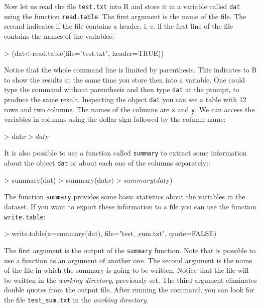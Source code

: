 \documentclass[letterpaper,12pt,oneside]{article}
\begin{document}
Now let us read the file {\tt test.txt} into R and store it in a variable called {\tt dat} using the function {\tt read.table}. The first argument is the name of the file. The second indicates if the file contains a header, i. e.  if the first line of the file contains the names of the variables:

\begin{Schunk}
\begin{Sinput}
> (dat<-read.table(file="test.txt", header=TRUE))
\end{Sinput}
\end{Schunk}


Notice that the whole command line is limited by parenthesis. This indicates to R to show the results at the same time you store then into a variable. One could type the command without parenthesis and then type {\tt dat} at the prompt, to produce the same result. Inspecting the object {\tt dat} you can see a table with 12 rows and two columns. The names of the columns are {\tt x} and {\tt y}. We can access the variables in columns using the dollar sign followed by the column name:

\begin{Schunk}
\begin{Sinput}
> dat$x
> dat$y 
\end{Sinput}
\end{Schunk}

It is also possible to use a function called {\tt summary} to extract some information about the object {\tt dat} or about each one of the columns separately:: 

\begin{Schunk}
\begin{Sinput}
> summary(dat)
> summary(dat$x)
> summary(dat$y)
\end{Sinput}
\end{Schunk}

The function {\tt summary} provides some basic statistics about the variables in the dataset. If you want to export these information to a file you can use the function {\tt write.table}:

\begin{Schunk}
\begin{Sinput}
> write.table(x=summary(dat), file="test_sum.txt", quote=FALSE)
\end{Sinput}
\end{Schunk}

The first argument is the output of the {\tt summary} function. Note that is possible to use a function as an argument of another one. The second argument is the name of the file in which the summary is going to be written. Notice that the file will be written in the {\it working directory}, previously set. The third argument eliminates double quotes from the output file. After running the command, you can look for the file {\tt test\_sum.txt} in the {\it working directory}.
 
\end{document}

